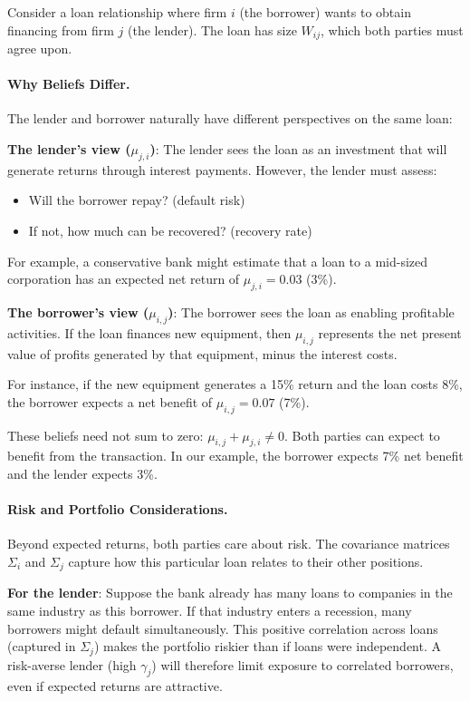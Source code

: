 \begin{example}
\label{ex:loan_contract}

Consider a loan relationship where firm $i$ (the borrower) wants to obtain financing from firm $j$ (the lender). The loan has size $W_{ij}$, which both parties must agree upon. 

\paragraph{Why Beliefs Differ.} The lender and borrower naturally have different perspectives on the same loan:

\textbf{The lender's view ($\mu_{j,i}$)}: The lender sees the loan as an investment that will generate returns through interest payments. However, the lender must assess:
\begin{itemize}
    \item Will the borrower repay? (default risk)
    \item If not, how much can be recovered? (recovery rate)
\end{itemize}

For example, a conservative bank might estimate that a loan to a mid-sized corporation has an expected net return of $\mu_{j,i} = 0.03$ (3\%).

\textbf{The borrower's view ($\mu_{i,j}$)}: The borrower sees the loan as enabling profitable activities. If the loan finances new equipment, then $\mu_{i,j}$ represents the net present value of profits generated by that equipment, minus the interest costs. 

For instance, if the new equipment generates a 15\% return and the loan costs 8\%, the borrower expects a net benefit of $\mu_{i,j} = 0.07$ (7\%).

These beliefs need not sum to zero: $\mu_{i,j} + \mu_{j,i} \neq 0$. Both parties can expect to benefit from the transaction. In our example, the borrower expects 7\% net benefit and the lender expects 3\%.

\paragraph{Risk and Portfolio Considerations.} Beyond expected returns, both parties care about risk. The covariance matrices $\Sigma_i$ and $\Sigma_j$ capture how this particular loan relates to their other positions.

\textbf{For the lender}: Suppose the bank already has many loans to companies in the same industry as this borrower. If that industry enters a recession, many borrowers might default simultaneously. This positive correlation across loans (captured in $\Sigma_j$) makes the portfolio riskier than if loans were independent. A risk-averse lender (high $\gamma_j$) will therefore limit exposure to correlated borrowers, even if expected returns are attractive.


\end{example}
